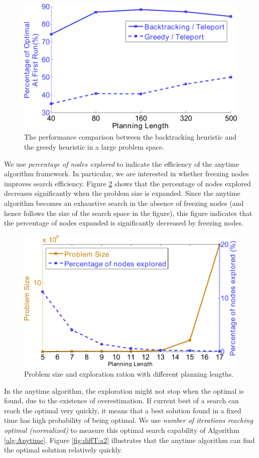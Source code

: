 \begin{figure}
\centering
\includegraphics[width=0.7\linewidth]{./images/largeprob}
\caption{The performance comparison between the backtracking heuristic and the greedy heuristic in a large problem space.}
\label{fig:largeprob}
\end{figure}

We use \emph{percentage of nodes explored} to indicate the efficiency of the anytime algorithm framework.
In particular, we are interested in whether freezing nodes improves search efficiency.
Figure \ref{fig:diffT:a1} shows that the percentage of nodes explored decreases significantly when the problem size is expanded.
Since the anytime algorithm becomes an exhaustive search in the absence of freezing nodes (and hence follows the size of the search space in the figure), this figure indicates that the percentage of nodes expanded is significantly decreased by freezing nodes.
\begin{figure}
\centering
\includegraphics[width=0.7\linewidth]{./images/T_ProbSize_ExpRatio.pdf}
\caption{Problem size and exploration ration with different planning lengths.}
\label{fig:diffT:a1}
\end{figure}
In the anytime algorithm, the exploration might not stop when the optimal is found, due to the existence of overestimation.
If current best of a search can reach the optimal very quickly, it means that a best solution found in a fixed time has high probability of being optimal.
We use \emph{number of iterations reaching optimal (normalized)} to measure this optimal search capability of Algorithm \ref{alg:Anytime}.
Figure \ref{fig:diffT:a2} illustrates that the anytime algorithm can find the optimal solution relatively quickly.

